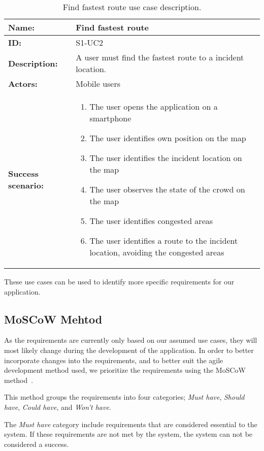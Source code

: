 \begin{table}[h!]
    \centering
    \begin{tabularx}{\textwidth}{|l|X|}
        \hline
        \textbf{Name:}  & Find fastest route \\ \hline
        \textbf{ID:}    & S1-UC2 \\ \hline
        \textbf{Description:} & A user must find the fastest route to a incident location. \\ \hline
        \textbf{Actors:} & Mobile users \\ \hline
        \textbf{Success scenario:} & 
        \begin{enumerate}
            \item The user opens the application on a smartphone
            \item The user identifies own position on the map
            \item The user identifies the incident location on the map
            \item The user observes the state of the crowd on the map
            \item The user identifies congested areas
            \item The user identifies a route to the incident location, avoiding the congested areas
        \end{enumerate}
        \\
        \hline
    \end{tabularx}
    \caption{Find fastest route use case description.}
    \label{tab:s1-uc2}
\end{table}

These use cases can be used to identify more specific requirements for our application.

\subsection{MoSCoW Mehtod}
As the requirements are currently only based on our assumed use cases, they will most likely change during the development of the application. In order to better incorporate changes into the requirements, and to better suit the agile development method used, we prioritize the requirements using the MoSCoW method~\cite{moscow}.

This method groups the requirements into four categories; \emph{Must have}, \emph{Should have}, \emph{Could have}, and \emph{Won't have}. 

The \emph{Must have} category include requirements that are considered essential to the system. If these requirements are not met by the system, the system can not be considered a success. 

